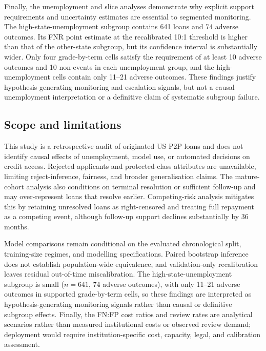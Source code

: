 \documentclass[10pt]{article}
\begin{document}
Finally, the unemployment and slice analyses demonstrate why explicit support requirements and uncertainty estimates are essential to segmented monitoring. The high-state-unemployment subgroup contains 641 loans and 74 adverse outcomes. Its FNR point estimate at the recalibrated 10:1 threshold is higher than that of the other-state subgroup, but its confidence interval is substantially wider. Only four grade-by-term cells satisfy the requirement of at least 10 adverse outcomes and 10 non-events in each unemployment group, and the high-unemployment cells contain only 11--21 adverse outcomes. These findings justify hypothesis-generating monitoring and escalation signals, but not a causal unemployment interpretation or a definitive claim of systematic subgroup failure.

\subsection{Scope and limitations}
\label{sec:limitations}

This study is a retrospective audit of originated US P2P loans and does not identify causal effects of unemployment, model use, or automated decisions on credit access. Rejected applicants and protected-class attributes are unavailable, limiting reject-inference, fairness, and broader generalisation claims. The mature-cohort analysis also conditions on terminal resolution or sufficient follow-up and may over-represent loans that resolve earlier. Competing-risk analysis mitigates this by retaining unresolved loans as right-censored and treating full repayment as a competing event, although follow-up support declines substantially by 36 months.

Model comparisons remain conditional on the evaluated chronological split, training-size regimes, and modelling specifications. Paired bootstrap inference does not establish population-wide equivalence, and validation-only recalibration leaves residual out-of-time miscalibration. The high-state-unemployment subgroup is small ($n=641$, 74 adverse outcomes), with only 11--21 adverse outcomes in supported grade-by-term cells, so these findings are interpreted as hypothesis-generating monitoring signals rather than causal or definitive subgroup effects. Finally, the FN:FP cost ratios and review rates are analytical scenarios rather than measured institutional costs or observed review demand; deployment would require institution-specific cost, capacity, legal, and calibration assessment.
\end{document}
